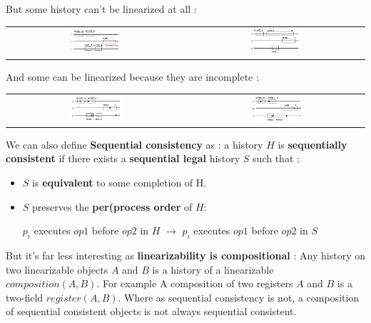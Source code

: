 \documentclass{article}
\theoremstyle{definition}
\begin{document}
But some history can't be linearized at all :
\begin{center}
\begin{tabular}{c c}
\includegraphics[width=0.3\textwidth]{linear_4}&
\includegraphics[width=0.3\textwidth]{linear_5}
\end{tabular}
\end{center}

And some can be linearized because they are incomplete :
\begin{center}
\begin{tabular}{c c}
\includegraphics[width=0.3\textwidth]{linear_6}&
\includegraphics[width=0.3\textwidth]{linear_7}
\end{tabular}
\end{center}

We can also define \textbf{Sequential consistency} as : a history $H$ is \textbf{sequentially consistent} if there exists a \textbf{sequential legal} history $S$ such that :
\begin{itemize}
\item $S$ is \textbf{equivalent} to some completion of H.
\item $S$ preserves the \textbf{per(process order} of $H$:
\begin{center}
$p_i$ executes $op1$ before $op2$ in $H$ $\rightarrow$ $p_i$ executes $op1$ before $op2$ in $S$
\end{center}
\end{itemize}

But it's far less interesting as \textbf{linearizability is compositional} : Any history on two linearizable objects $A$ and $B$ is a history of a linearizable $composition(A,B)$. For example A composition of two registers $A$ and $B$ is a two-field $register(A,B)$. Where as sequential consistency is not, a composition of sequential consistent objects is not always sequential consistent.
\end{document}
